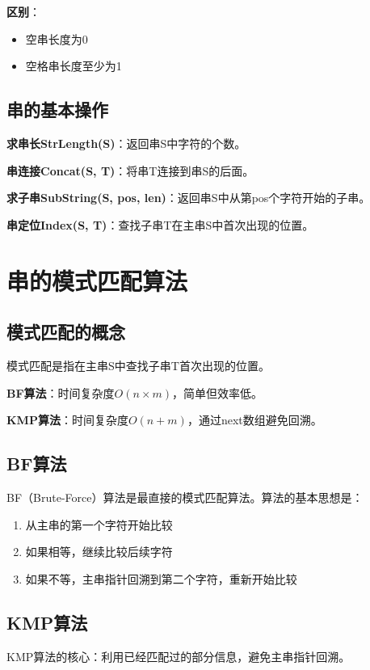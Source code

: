 \documentclass[12pt, a4paper]{article}
\begin{document}
\textbf{区别}：
\begin{itemize}
	\item 空串长度为0
	\item 空格串长度至少为1
\end{itemize}

\subsection{串的基本操作}

\textbf{求串长StrLength(S)}：返回串S中字符的个数。

\textbf{串连接Concat(S, T)}：将串T连接到串S的后面。

\textbf{求子串SubString(S, pos, len)}：返回串S中从第pos个字符开始的子串。

\textbf{串定位Index(S, T)}：查找子串T在主串S中首次出现的位置。

\section{串的模式匹配算法}

\subsection{模式匹配的概念}

模式匹配是指在主串S中查找子串T首次出现的位置。

\textbf{BF算法}：时间复杂度$O(n \times m)$，简单但效率低。

\textbf{KMP算法}：时间复杂度$O(n + m)$，通过next数组避免回溯。

\subsection{BF算法}

BF（Brute-Force）算法是最直接的模式匹配算法。算法的基本思想是：
\begin{enumerate}
	\item 从主串的第一个字符开始比较
	\item 如果相等，继续比较后续字符
	\item 如果不等，主串指针回溯到第二个字符，重新开始比较
\end{enumerate}

\subsection{KMP算法}

KMP算法的核心：利用已经匹配过的部分信息，避免主串指针回溯。
\end{document}
